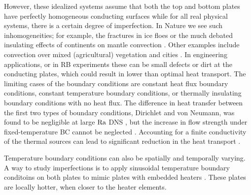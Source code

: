However, these idealized systems assume that both the top and bottom plates
have perfectly homogeneous conducting surfaces while for all real physical
systems, there is a certain degree of imperfection.  In Nature we see such
inhomogeneities; for example, the fractures in ice floes \citep{Marcq2012} or the
much debated insulating effects of continents on mantle convection
\citep{Lenardic2005}.  Other examples include convection over mixed (agricultural)
vegetation and cities \citep{Zhao2014}.  In engineering applications, or in RB
experiments these can be small defects or dirt at the conducting plates, which
could result in lower than optimal heat transport. The limiting
cases of the boundary conditions are constant heat flux boundary
conditions, constant temperature boundary conditions, or thermally
insulating boundary conditions with no heat flux.  The difference in heat
transfer between the first two types of boundary conditions, Dirichlet and
von Neumann, was found to be negligible at large $\text{Ra}$ DNS
\citep{Johnston2007,
Johnston2009, Stevens2011}, but the increase in flow strength under fixed-temperature
BC cannot be neglected \citep{Huang2015}. Accounting for a finite conductivity
of the thermal sources can lead to significant reduction in the heat transport
\citep{Verzicco2004}.

Temperature boundary conditions can also be spatially and temporally varying.
A way to study imperfections is to apply sinusoidal temperature boundary
conditoins on both plates to mimic plates with embedded heaters
\citep{Kelly1978,
Yoo1991}. These plates are locally hotter, when closer to the heater elements.

